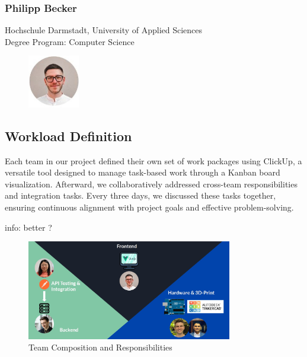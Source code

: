 \subsubsection{Philipp Becker}
Hochschule Darmstadt, University of Applied Sciences \\
Degree Program: Computer Science
\begin{figure}[h]
    \centering
    \includegraphics[width=0.2\textwidth]{images/philipp.JPG}
\end{figure}
\newpage
\subsection{Workload Definition}

Each team in our project defined their own set of work packages using ClickUp, a versatile tool designed to manage task-based work through a Kanban board visualization. Afterward, we collaboratively addressed cross-team responsibilities and integration tasks. Every three days, we discussed these tasks together, ensuring continuous alignment with project goals and effective problem-solving.

info: better ?

\begin{figure}[h]
    \centering
    \includegraphics[width=0.8\textwidth]{images/workload.JPG}
    \caption{Team Composition and Responsibilities}
\end{figure}



